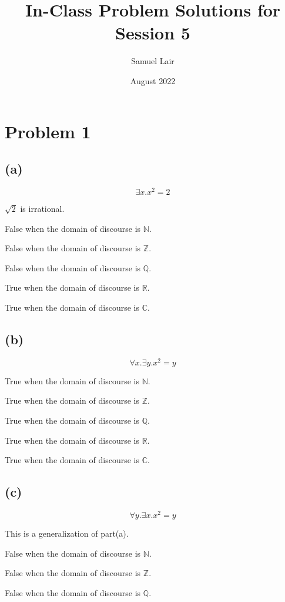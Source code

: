 \documentclass{article}
\title{In-Class Problem Solutions for Session 5}
\author{Samuel Lair}
\date{August 2022}
\begin{document}
\maketitle
\tableofcontents

\pagebreak

\section{Problem 1}

\subsection{(a)}
\[
	\exists x.x^2 = 2
\]

$\sqrt{2}$ is irrational.

False when the domain of discourse is $\mathbb{N}$.

False when the domain of discourse is $\mathbb{Z}$.

False when the domain of discourse is $\mathbb{Q}$.

True when the domain of discourse is $\mathbb{R}$.

True when the domain of discourse is $\mathbb{C}$.

\subsection{(b)}
\[
	\forall x. \exists y. x^2 = y
\]

True when the domain of discourse is $\mathbb{N}$.

True when the domain of discourse is $\mathbb{Z}$.

True when the domain of discourse is $\mathbb{Q}$.

True when the domain of discourse is $\mathbb{R}$.

True when the domain of discourse is $\mathbb{C}$.

\subsection{(c)}
\[
	\forall y. \exists x.x^2 = y
\]

This is a generalization of part(a).

False when the domain of discourse is $\mathbb{N}$.

False when the domain of discourse is $\mathbb{Z}$.

False when the domain of discourse is $\mathbb{Q}$.
\end{document}
